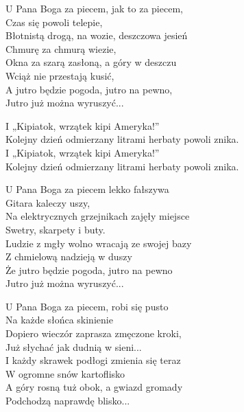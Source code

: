 \begin{text}
    \small{
    U Pana Boga za piecem, jak to za piecem,\\
    Czas się powoli telepie,\\
    Błotnistą drogą, na wozie, deszczowa jesień\\
    Chmurę za chmurą wiezie,\\
    Okna za szarą zasłoną, a góry w deszczu\\
    Wciąż nie przestają kusić,\\
    A jutro będzie pogoda, jutro na pewno,\\
    Jutro już można wyruszyć...

    \vin I „Kipiatok, wrzątek kipi Ameryka!”\\
    \vin Kolejny dzień odmierzany litrami herbaty powoli znika.\\
    \vin I „Kipiatok, wrzątek kipi Ameryka!”\\
    \vin Kolejny dzień odmierzany litrami herbaty powoli znika.

    U Pana Boga za piecem lekko fałszywa\\
    Gitara kaleczy uszy,\\
    Na elektrycznych grzejnikach zajęły miejsce\\
    Swetry, skarpety i buty.\\
    Ludzie z mgły wolno wracają ze swojej bazy\\
    Z chmielową nadzieją w duszy\\
    Że jutro będzie pogoda, jutro na pewno\\
    Jutro już można wyruszyć...

    U Pana Boga za piecem, robi się pusto\\
    Na każde słońca skinienie\\
    Dopiero wieczór zaprasza zmęczone kroki,\\
    Już słychać jak dudnią w sieni...\\
    I każdy skrawek podłogi zmienia się teraz\\
    W ogromne snów kartoflisko\\
    A góry rosną tuż obok, a gwiazd gromady\\
    Podchodzą naprawdę blisko...
    }
\end{text}
